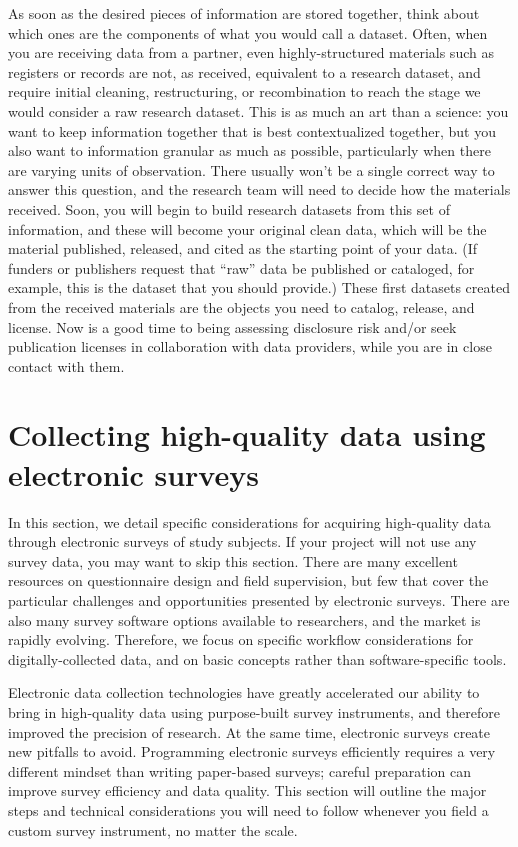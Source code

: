 As soon as the desired pieces of information are stored together,
think about which ones are the components of what you would call a dataset.
Often, when you are receiving data from a partner,
even highly-structured materials such as registers or records
are not, as received, equivalent to a research dataset,
and require initial cleaning, restructuring, or recombination
to reach the stage we would consider a raw research dataset.
This is as much an art than a science:
you want to keep information together that is best contextualized together,
but you also want to information granular as much as possible,
particularly when there are varying units of observation.
There usually won't be a single correct way to answer this question,
and the research team will need to decide how the materials received.
Soon, you will begin to build research datasets from this set of information,
and these will become your original clean data,
which will be the material published, released, and cited
as the starting point of your data.
(If funders or publishers request that ``raw'' data be published or cataloged,
for example, this is the dataset that you should provide.)
These first datasets created from the received materials
are the objects you need to catalog, release, and license.
Now is a good time to being assessing disclosure risk
and/or seek publication licenses in collaboration with data providers,
while you are in close contact with them.





\section{Collecting high-quality data using electronic surveys}
In this section, we detail specific considerations
for acquiring high-quality data through electronic surveys of study subjects.
If your project will not use any survey data, you may want to skip this section.
There are many excellent resources on questionnaire design and field supervision,
but few that cover the particular challenges and opportunities presented by electronic surveys.
There are also many survey software options available to researchers,
and the market is rapidly evolving.
Therefore, we focus on specific workflow considerations for digitally-collected data,
and on basic concepts rather than software-specific tools.

Electronic data collection technologies
have greatly accelerated our ability to bring in high-quality data
using purpose-built survey instruments,
and therefore improved the precision of research.
At the same time, electronic surveys create new pitfalls to avoid.
Programming electronic surveys efficiently requires a very different mindset 
than writing paper-based surveys;
careful preparation can improve survey efficiency and data quality.
This section will outline the major steps and technical considerations
you will need to follow whenever you field a custom survey instrument,
no matter the scale.

